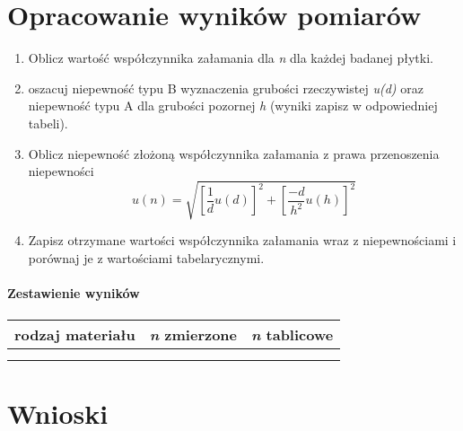 \documentclass[a4paper,10pt,twoside]{article}
\begin{document}
	\section{Opracowanie wyników pomiarów}
	\begin{enumerate}
		\item Oblicz wartość współczynnika załamania dla \textit{n} dla każdej badanej płytki.
		\item oszacuj niepewność typu B wyznaczenia grubości rzeczywistej \textit{u(d)} oraz niepewność typu A dla grubości pozornej \textit{h} (wyniki zapisz w odpowiedniej tabeli).
		\item Oblicz niepewność złożoną współczynnika załamania z prawa przenoszenia niepewności $$  u(n) = \sqrt{\left[\frac{1}{d}u(d)\right]^2 + \left[ \frac{-d}{h^2}u(h)\right]^2}$$
		\item Zapisz otrzymane wartości współczynnika załamania wraz z niepewnościami i porównaj je z wartościami tabelarycznymi. 
 	\end{enumerate}
 \paragraph{Zestawienie wyników} 
 \paragraph{}
 \begin{center}
 
 	\begin{tabular}[b]{|c|c|c|}
 		\hline
 		rodzaj materiału & \textit{n} zmierzone & \textit{n} tablicowe \\ \hline
 		&& \\ \hline
 		&& \\ \hline
 	\end{tabular}
\end{center}
	\noindent
	
	
	\section{Wnioski}
\end{document}
